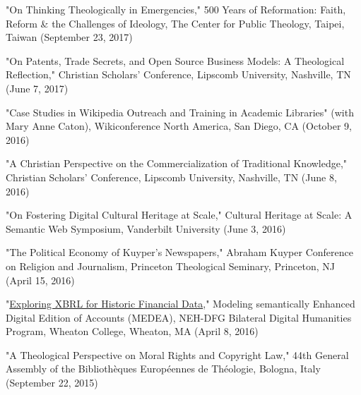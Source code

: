\documentclass[10pt]{res} %
\begin{document}
\begin{resume}
\begin{hangparas}{.25in}{1}"On Thinking Theologically in Emergencies," 500 Years of Reformation: Faith, Reform \& the Challenges of Ideology, The Center for Public Theology, Taipei, Taiwan (September 23, 2017)\end{hangparas}

\begin{hangparas}{.25in}{1}"On Patents, Trade Secrets, and Open Source Business Models: A Theological Reflection," Christian Scholars’ Conference, Lipscomb University, Nashville, TN (June 7, 2017)\end{hangparas}

\begin{hangparas}{.25in}{1}"Case Studies in Wikipedia Outreach and Training in Academic Libraries" (with Mary Anne Caton), Wikiconference North America, San Diego, CA (October 9, 2016)\end{hangparas}

\begin{hangparas}{.25in}{1}"A Christian Perspective on the Commercialization of Traditional Knowledge," Christian Scholars’ Conference, Lipscomb University, Nashville, TN (June 8, 2016)\end{hangparas}

\begin{hangparas}{.25in}{1}"On Fostering Digital Cultural Heritage at Scale," Cultural Heritage at Scale: A Semantic Web Symposium, Vanderbilt University (June 3, 2016)\end{hangparas}

\begin{hangparas}{.25in}{1}"The Political Economy of Kuyper’s Newspapers," Abraham Kuyper Conference on Religion and Journalism, Princeton Theological Seminary, Princeton, NJ (April 15, 2016)\end{hangparas}

\begin{hangparas}{.25in}{1}"\href{http://medea.hypotheses.org/497}{Exploring XBRL for Historic Financial Data}," Modeling semantically Enhanced Digital Edition of Accounts (MEDEA), NEH-DFG Bilateral Digital Humanities Program, Wheaton College, Wheaton, MA (April 8, 2016)\end{hangparas}

\begin{hangparas}{.25in}{1}"A Theological Perspective on Moral Rights and Copyright Law," 44th General Assembly of the Bibliothèques Européennes de Théologie, Bologna, Italy (September 22, 2015)\end{hangparas}


\end{resume}
\end{document}
